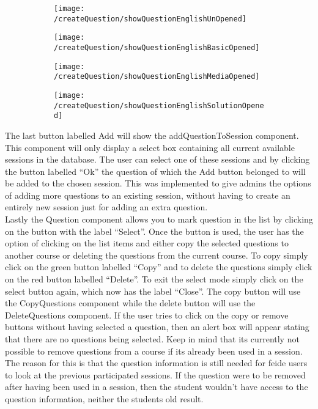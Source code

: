 \begin{figure}[H]
	\centering
	\begin{subfigure}{0.80\linewidth}
		\texttt{[image: /createQuestion/showQuestionEnglishUnOpened]}
		\caption{}
		\label{fig:showQuestionUnOpened}
	\end{subfigure}
	\begin{subfigure}{0.32\linewidth}
		\texttt{[image: /createQuestion/showQuestionEnglishBasicOpened]}
		\caption{}
		\label{fig:showQuestionBasicOpened}
	\end{subfigure}
	\begin{subfigure}{0.32\linewidth}
		\texttt{[image: /createQuestion/showQuestionEnglishMediaOpened]}
		\caption{}
		\label{fig:showQuestionMediaOpened}
	\end{subfigure}
	\begin{subfigure}{0.32\linewidth}
		\texttt{[image: /createQuestion/showQuestionEnglishSolutionOpened]}
		\caption{}
		\label{fig:showQuestionSolutionOpened}
	\end{subfigure}
\end{figure}
The last button labelled Add will show the addQuestionToSession component. This component will only display a select box containing all current available sessions in the database. The user can select one of these sessions and by clicking the button labelled “Ok” the question of which the Add button belonged to will be added to the chosen session. This was implemented to give admins the options of adding more questions to an existing session, without having to create an entirely new session just for adding an extra question.\\[11pt]
Lastly the Question component allows you to mark question in the list by clicking on the button with the label “Select”. Once the button is used, the user has the option of clicking on the list items and either copy the selected questions to another course or deleting the questions from the current course. To copy simply click on the green button labelled “Copy” and to delete the questions simply click on the red button labelled “Delete”. To exit the select mode simply click on the select button again, which now has the label “Close”. The copy button will use the CopyQuestions component while the delete button will use the DeleteQuestions component. If the user tries to click on the copy or remove buttons without having selected a question, then an alert box will appear stating that there are no questions being selected. Keep in mind that its currently not possible to remove questions from a course if its already been used in a session. The reason for this is that the question information is still needed for feide users to look at the previous participated sessions. If the question were to be removed after having been used in a session, then the student wouldn’t have access to the question information, neither the students old result. \\[11pt]
